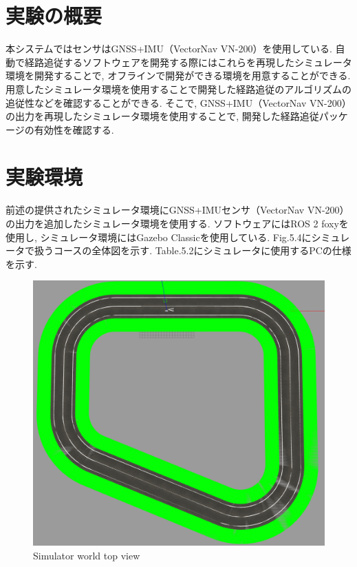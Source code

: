 \section{実験の概要}
本システムではセンサはGNSS+IMU（VectorNav VN-200）を使用している.
自動で経路追従するソフトウェアを開発する際にはこれらを再現したシミュレータ環境を開発することで, オフラインで開発ができる環境を用意することができる.
用意したシミュレータ環境を使用することで開発した経路追従のアルゴリズムの追従性などを確認することができる.
そこで, GNSS+IMU（VectorNav VN-200）の出力を再現したシミュレータ環境を使用することで, 開発した経路追従パッケージの有効性を確認する.


\section{実験環境}
前述の提供されたシミュレータ環境にGNSS+IMUセンサ（VectorNav VN-200）の出力を追加したシミュレータ環境を使用する.
ソフトウェアにはROS 2 foxyを使用し, シミュレータ環境にはGazebo Classicを使用している.
Fig.5.4にシミュレータで扱うコースの全体図を示す.
Table.5.2にシミュレータに使用するPCの仕様を示す.

\begin{figure}[H]
  \centering
 \includegraphics[keepaspectratio, scale=0.3]
      {images/topviewsim.png}
 \caption{Simulator world top view}
 \label{fig:simulator}
\end{figure}

